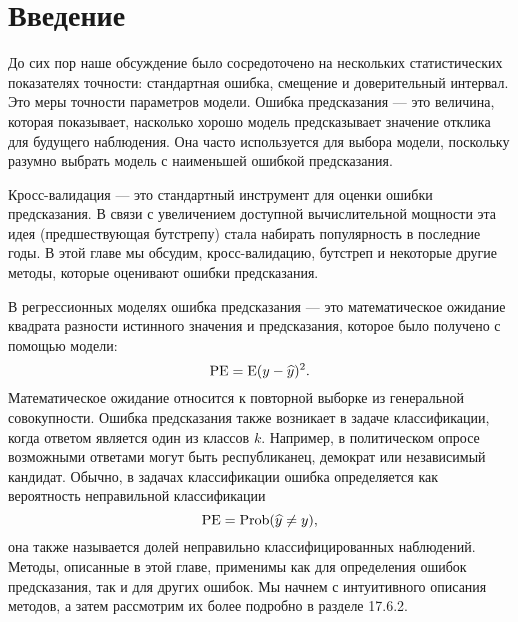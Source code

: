 \section{Введение}
До сих пор наше обсуждение было сосредоточено на нескольких статистических показателях точности: стандартная ошибка, смещение и доверительный интервал. Это меры точности параметров модели. Ошибка предсказания --- это величина, которая показывает, насколько хорошо модель предсказывает значение отклика для будущего наблюдения. Она часто используется для выбора модели, поскольку разумно выбрать модель с наименьшей ошибкой предсказания.

Кросс-валидация --- это стандартный инструмент для оценки ошибки предсказания. В связи с увеличением доступной вычислительной мощности эта идея (предшествующая бутстрепу) стала набирать популярность в последние годы. В этой главе мы обсудим, кросс-валидацию, бутстреп и некоторые другие методы, которые оценивают ошибки предсказания.

В регрессионных моделях ошибка предсказания --- это математическое ожидание квадрата разности истинного значения и предсказания, которое было получено с помощью модели: 
\begin{equation}
\text{PE} = \text{E}(y - \widehat{y})^{2}.
\end{equation}
Математическое ожидание относится к повторной выборке из генеральной совокупности. Ошибка предсказания также возникает в задаче классификации, когда ответом является один из классов $k$. Например, в политическом опросе возможными ответами могут быть республиканец, демократ или независимый кандидат. Обычно, в задачах классификации ошибка определяется как вероятность неправильной классификации
\begin{equation}
\text{PE} = \text{Prob}(\widehat{y} \neq y),
\end{equation}
она также называется долей неправильно классифицированных наблюдений. Методы, описанные в этой главе, применимы как для определения ошибок предсказания, так и для других ошибок. Мы начнем с интуитивного описания методов, а затем рассмотрим их более подробно в разделе 17.6.2.
